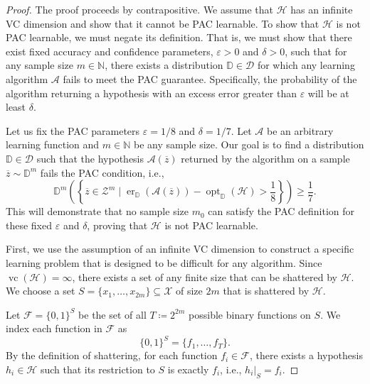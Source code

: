 \begin{proof}

    The proof proceeds by contrapositive. We assume that $\mathcal{H}$ has an infinite VC dimension and show that it cannot be PAC learnable. To show that $\mathcal{H}$ is not PAC learnable, we must negate its definition. That is, we must show that there exist fixed accuracy and confidence parameters, $\varepsilon > 0$ and $\delta > 0$, such that for any sample size $m \in \mathbb{N}$, there exists a distribution $\mathbb{D} \in \mathcal{D}$ for which any learning algorithm $\mathcal{A}$ fails to meet the PAC guarantee. Specifically, the probability of the algorithm returning a hypothesis with an excess error greater than $\varepsilon$ will be at least $\delta$.

    Let us fix the PAC parameters $\varepsilon = 1/8$ and $\delta = 1/7$. Let $\mathcal{A}$ be an arbitrary learning function and $m \in \mathbb{N}$ be any sample size. Our goal is to find a distribution $\mathbb{D} \in \mathcal{D}$ such that the hypothesis $\mathcal{A}(\overline{z})$ returned by the algorithm on a sample $\overline{z} \sim \mathbb{D}^m$ fails the PAC condition, i.e.,
    \[
        \mathbb{D}^m\left(\left\{ \overline{z} \in \mathcal{Z}^m \mid \operatorname{er}_{\mathbb{D}}(\mathcal{A}(\overline{z})) - \operatorname{opt}_{\mathbb{D}}(\mathcal{H}) > \frac{1}{8} \right\}\right) \ge \frac{1}{7}.
    \]
    This will demonstrate that no sample size $m_0$ can satisfy the PAC definition for these fixed $\varepsilon$ and $\delta$, proving that $\mathcal{H}$ is not PAC learnable.

    First, we use the assumption of an infinite VC dimension to construct a specific learning problem that is designed to be difficult for any algorithm. Since $\operatorname{vc}(\mathcal{H}) = \infty$, there exists a set of any finite size that can be shattered by $\mathcal{H}$. We choose a set $S = \{x_1, \dots, x_{2m}\} \subseteq \mathcal{X}$ of size $2m$ that is shattered by $\mathcal{H}$.

    Let $\mathcal{F} = \{0,1\}^S$ be the set of all $T \coloneq 2^{2m}$ possible binary functions on $S$. We index each function in $\mathcal{F}$ as
    \[
        \{0,1\}^S = \{f_1, \dots, f_T\}.
    \]
    By the definition of shattering, for each function $f_i \in \mathcal{F}$, there exists a hypothesis $h_i \in \mathcal{H}$ such that its restriction to $S$ is exactly $f_i$, i.e., $h_i|_S = f_i$.


\end{proof}
